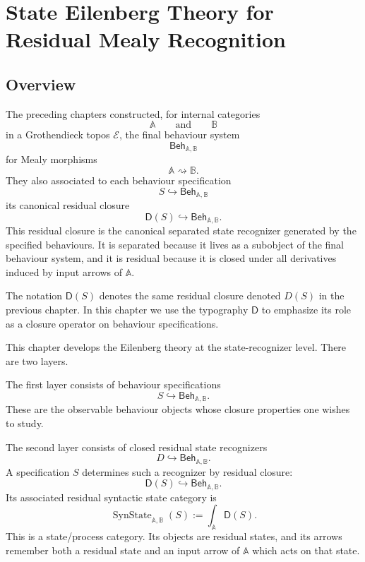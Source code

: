 \chapter{State Eilenberg Theory for Residual Mealy Recognition}
\label{ch:state-eilenberg-residual-mealy-recognition}

\section{Overview}
\label{sec:state-eilenberg-overview}

The preceding chapters constructed, for internal categories
\[
\mathbb A
\qquad\text{and}\qquad
\mathbb B
\]
in a Grothendieck topos \(\mathcal E\), the final behaviour system
\[
\mathsf{Beh}_{\mathbb A,\mathbb B}
\]
for Mealy morphisms
\[
\mathbb A\rightsquigarrow\mathbb B.
\]
They also associated to each behaviour specification
\[
S\hookrightarrow \mathsf{Beh}_{\mathbb A,\mathbb B}
\]
its canonical residual closure
\[
\mathsf D(S)\hookrightarrow \mathsf{Beh}_{\mathbb A,\mathbb B}.
\]
This residual closure is the canonical separated state recognizer generated
by the specified behaviours. It is separated because it lives as a subobject
of the final behaviour system, and it is residual because it is closed under
all derivatives induced by input arrows of \(\mathbb A\).

The notation \(\mathsf D(S)\) denotes the same residual closure denoted
\(D(S)\) in the previous chapter. In this chapter we use the typography
\(\mathsf D\) to emphasize its role as a closure operator on behaviour
specifications.

This chapter develops the Eilenberg theory at the state-recognizer level.
There are two layers.

The first layer consists of behaviour specifications
\[
S\hookrightarrow \mathsf{Beh}_{\mathbb A,\mathbb B}.
\]
These are the observable behaviour objects whose closure properties one
wishes to study.

The second layer consists of closed residual state recognizers
\[
D\hookrightarrow \mathsf{Beh}_{\mathbb A,\mathbb B}.
\]
A specification \(S\) determines such a recognizer by residual closure:
\[
\mathsf D(S)\hookrightarrow \mathsf{Beh}_{\mathbb A,\mathbb B}.
\]
Its associated residual syntactic state category is
\[
\operatorname{SynState}_{\mathbb A,\mathbb B}(S)
:=
\int_{\mathbb A}\mathsf D(S).
\]
This is a state/process category. Its objects are residual states, and its
arrows remember both a residual state and an input arrow of \(\mathbb A\)
which acts on that state.

